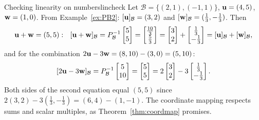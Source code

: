 \documentclass[11pt]{article}
\begin{document}
\begin{exmp}{Checking linearity on numbers}{lincheck}
Let $\mathcal{B}=\{(2,1),(-1,1)\}$, $\mathbf{u}=(4,5)$, $\mathbf{w}=(1,0)$. From Example~\ref{ex:PB2}: $[\mathbf{u}]_{\mathcal{B}}=(3,2)$ and $[\mathbf{w}]_{\mathcal{B}}=(\tfrac13,-\tfrac13)$. Then
\[
\bv{u}+\bv{w}=(5,5):\ \ [\bv{u}+\bv{w}]_{\mathcal{B}}=P_{\mathcal{B}}^{-1}\begin{bmatrix}5\\5\end{bmatrix}=\begin{bmatrix}\tfrac{10}{3}\\\tfrac53\end{bmatrix}=\begin{bmatrix}3\\2\end{bmatrix}+\begin{bmatrix}\tfrac13\\-\tfrac13\end{bmatrix}=[\bv{u}]_{\mathcal{B}}+[\bv{w}]_{\mathcal{B}},
\]
and for the combination $2\mathbf{u}-3\mathbf{w}=(8,10)-(3,0)=(5,10)$:
\[
[2\mathbf{u}-3\mathbf{w}]_{\mathcal{B}}=P_{\mathcal{B}}^{-1}\begin{bmatrix}5\\10\end{bmatrix}=\begin{bmatrix}5\\5\end{bmatrix}=2\begin{bmatrix}3\\2\end{bmatrix}-3\begin{bmatrix}\tfrac13\\-\tfrac13\end{bmatrix}.
\]
Both sides of the second equation equal $(5,5)$ since $2(3,2)-3(\tfrac13,-\tfrac13)=(6,4)-(1,-1)$. The coordinate mapping respects sums and scalar multiples, as Theorem~\ref{thm:coordmap} promises.
\end{exmp}
\end{document}
